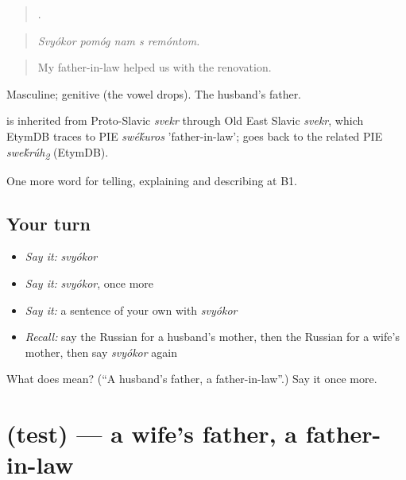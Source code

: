 \begin{quote}
    .
\end{quote}

\begin{quote}
\emph{Svyókor pomóg nam s remóntom.}
\end{quote}

\begin{quote}
My father-in-law helped us with the renovation.
\end{quote}

Masculine; genitive  (the vowel drops). The husband's father.

\begin{cousinweb}
\emph{} is inherited from Proto-Slavic \emph{svekr} through Old East Slavic \emph{svekr}, which EtymDB traces to PIE \emph{swé\'{k}uros} 'father-in-law'; \emph{} goes back to the related PIE \emph{swe\'{k}rúh\textsubscript{2}} (EtymDB).
\end{cousinweb}

\begin{grammarlens}[title={What you've built}]
One more word for telling, explaining and describing at B1.
\end{grammarlens}

\subsection*{Your turn}
\begin{itemize}
\raggedright
  \item \emph{Say it:} \emph{svyókor}
  \item \emph{Say it:} \emph{svyókor}, once more
  \item \emph{Say it:} a sentence of your own with \emph{svyókor}
  \item \emph{Recall:} say the Russian for a husband's mother, then the Russian for a wife's mother, then say \emph{svyókor} again
\end{itemize}

\begin{tcolorbox}[breakable,colback=teal!4,colframe=teal!35!black,title={Before you move on}]
What does  mean? (\textquotedblleft{}A husband's father, a father-in-law\textquotedblright{}.) Say it once more.
\end{tcolorbox}
\section[\texorpdfstring{\ru{тесть} (test)}{тесть (test)}]{ (test) — a wife's father, a father-in-law}

